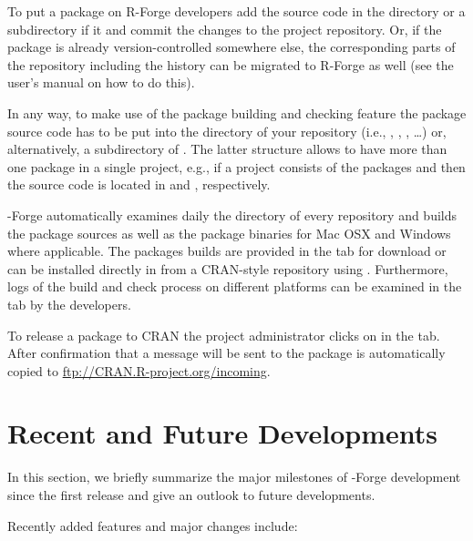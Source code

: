 To put a package on R-Forge developers add the source code in the
 directory or a subdirectory if it and commit the changes to
the project repository. Or, if the package is already
version-controlled somewhere else, the corresponding parts of the
repository including the history can be migrated to R-Forge as well
(see the user's manual on how to do this).

In any way, to make use of the package building and checking feature
the package source code has to be put into the  directory
of your repository (i.e., ,
, , \ldots{}) or, alternatively, a 
subdirectory of . The latter structure allows to
have more than one package in a single project, e.g., if
a project consists of the packages  and  then the
source code is located in  and ,
respectively.

\R{}-Forge automatically examines daily the  directory of
every repository and builds the package sources as well as the package
binaries for Mac OSX and Windows where applicable. The packages builds
are provided in the  tab for download or can be
installed directly in \R{} from a CRAN-style repository using 
. Furthermore, logs of the
build and check process on different platforms can be examined in the
 tab by the developers.

To release a package to CRAN the project administrator clicks on
 in the  tab. After
confirmation that a message will be sent to 
the package is automatically copied to
\url{ftp://CRAN.R-project.org/incoming}.

\section*{Recent and Future Developments}

In this section, we briefly summarize the major milestones of
\R{}-Forge development since the first release and give an outlook to
future developments.

Recently added features and major changes include:

